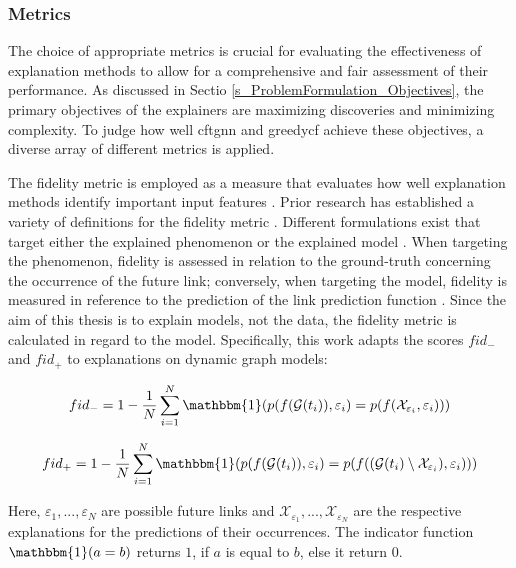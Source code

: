 \subsubsection{Metrics} 
\label{s_Evaluation_Setup_Metrics}
The choice of appropriate metrics is crucial for evaluating the effectiveness of explanation methods to allow for a comprehensive and fair assessment of their performance. As discussed in Sectio \ref{s_ProblemFormulation_Objectives}, the primary objectives of the explainers are maximizing discoveries and minimizing complexity. To judge how well \gls{cftgnn} and \gls{greedycf} achieve these objectives, a diverse array of different metrics is applied.

The fidelity metric is employed as a measure that evaluates how well explanation methods identify important input features \cite{yuan_explainability_2020}. Prior research has established a variety of definitions for the fidelity metric \cite{yuan_explainability_2020, lucic_cf-gnnexplainer_2022, xia_explaining_2023, amara_graphframex_2022, prado-romero_survey_2023}. Different formulations exist that target either the explained phenomenon or the explained model \cite{amara_graphframex_2022}. When targeting the phenomenon, fidelity is assessed in relation to the ground-truth concerning the occurrence of the future link; conversely, when targeting the model, fidelity is measured in reference to the prediction of the link prediction function \cite{amara_graphframex_2022}. Since the aim of this thesis is to explain models, not the data, the fidelity metric is calculated in regard to the model. Specifically, this work adapts the scores $fid_-$ and $fid_+$ \cite{amara_graphframex_2022, yuan_explainability_2020} to explanations on dynamic graph models:

\begin{equation}
    fid_- = 1 - \frac{1}{N} \sum_{i = 1}^N \mathbbm{1}(p(f(\mathcal{G}(t_i)), \varepsilon_i) = p(f(\mathcal{X}_{\varepsilon_i}, \varepsilon_i)))
\end{equation}

\begin{equation}
    fid_+ = 1 - \frac{1}{N} \sum_{i = 1}^N \mathbbm{1}(p(f(\mathcal{G}(t_i)), \varepsilon_i) = p(f((\mathcal{G}(t_i) \setminus \mathcal{X}_{\varepsilon_i}), \varepsilon_i))) 
\end{equation}

Here, $\varepsilon_1, ..., \varepsilon_N$ are possible future links and $\mathcal{X}_{\varepsilon_1},...,\mathcal{X}_{\varepsilon_N}$ are the respective explanations for the predictions of their occurrences. The indicator function $\mathbbm{1}(a = b)$ returns $1$, if $a$ is equal to $b$, else it return $0$.

